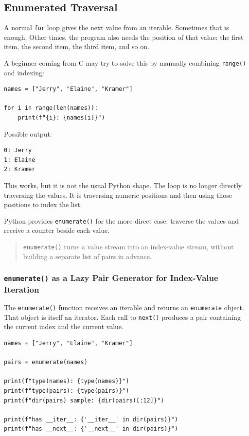 \subsection{Enumerated Traversal}

A normal \texttt{for} loop gives the next value from an iterable. Sometimes that is enough. Other times, the program also needs the position of that value: the first item, the second item, the third item, and so on.

A beginner coming from C may try to solve this by manually combining \texttt{range()} and indexing:

\begin{verbatim}
names = ["Jerry", "Elaine", "Kramer"]

for i in range(len(names)):
    print(f"{i}: {names[i]}")
\end{verbatim}

Possible output:

\begin{verbatim}
0: Jerry
1: Elaine
2: Kramer
\end{verbatim}

This works, but it is not the usual Python shape. The loop is no longer directly traversing the values. It is traversing numeric positions and then using those positions to index the list.

Python provides \texttt{enumerate()} for the more direct case: traverse the values and receive a counter beside each value.

\begin{quote}
\texttt{enumerate()} turns a value stream into an index-value stream, without building a separate list of pairs in advance.
\end{quote}

\subsubsection{\texttt{enumerate()} as a Lazy Pair Generator for Index-Value Iteration}

The \texttt{enumerate()} function receives an iterable and returns an \texttt{enumerate} object. That object is itself an iterator. Each call to \texttt{next()} produces a pair containing the current index and the current value.

\begin{verbatim}
names = ["Jerry", "Elaine", "Kramer"]

pairs = enumerate(names)

print(f"type(names): {type(names)}")
print(f"type(pairs): {type(pairs)}")
print(f"dir(pairs) sample: {dir(pairs)[:12]}")

print(f"has __iter__: {'__iter__' in dir(pairs)}")
print(f"has __next__: {'__next__' in dir(pairs)}")
\end{verbatim}

